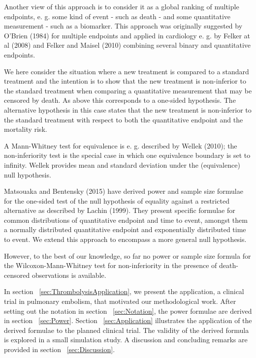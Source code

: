 \documentclass[bimj,fleqn]{w-art}
\theoremstyle{plain}
\theoremstyle{definition}
\begin{document}
Another view of this approach is to consider it as a global ranking of
multiple endpoints, e. g. some kind of event - such as death - and some
quantitative measurement - such as a biomarker. This approach was originally
suggested by O'Brien (1984) for multiple endpoints and applied in cardiology
e. g. by Felker at al (2008) and Felker and Maisel (2010) combining several
binary and quantitative endpoints.

We here consider the situation where a new treatment is compared to a standard
treatment and the intention is to show that the new treatment is non-inferior
to the standard treatment when comparing a quantitative measurement that may
be censored by death. As above this corresponds to a one-sided hypothesis.
The alternative hypothesis in this case states that the new treatment is
non-inferior to the standard treatment with respect to both the quantitative
endpoint and the mortality risk.

A Mann-Whitney test for equivalence is e. g. described by Wellek (2010); the
non-inferiority test is the special case in which one equivalence boundary is set
to infinity. Wellek provides mean and standard deviation under the (equivalence)
null hypothesis.

Matsouaka and Bentensky (2015) have derived power and sample size formulae for
the one-sided test of the null hypothesis of equality against a restricted
alternative as described by Lachin (1999). They present specific formulae for
common distributions of quantitative endpoint and time to event, amongst them
a normally distributed quantitative endpoint and exponentially distributed
time to event. We extend this approach to encompass a more general null
hypothesis.

However, to the best of our knowledge, so far no power or sample size formula
for the Wilcoxon-Mann-Whitney test for non-inferiority in the presence of
death-censored observations is available.

In section ~\ref{sec:ThrombolysisApplication}, we present the
application, a clinical trial in pulmonary embolism, that motivated our
methodological work. After setting out the notation in section
~\ref{sec:Notation}, the power formulae are derived in section ~\ref{sec:Power}.
Section ~\ref{sec:Application} illustrates the application of the derived
formulae to the planned clinical trial. The validity of the derived formula
is explored in a small simulation study. A discussion and concluding remarks
are provided in section ~\ref{sec:Discussion}.
\end{document}
